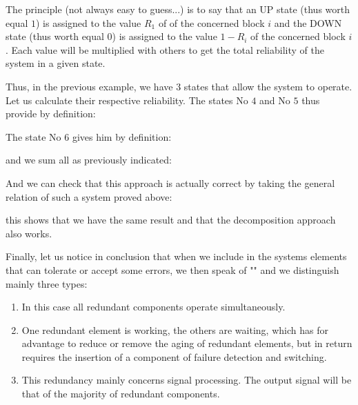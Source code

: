 	The principle (not always easy to guess...) is to say that an UP state (thus worth equal $1$) is assigned to the value $R_1$ of of the concerned block $i$ and the DOWN state (thus worth equal $0$) is assigned to the value $1-R_i$ of the concerned block $i$. Each value will be multiplied with others to get the total reliability of the system in a given state.
	
	Thus, in the previous example, we have $3$ states that allow the system to operate. Let us calculate their respective reliability. The states No $4$ and No $5$ thus provide by definition:
	
	The state No $6$ gives him by definition:
	
	and we sum all as previously indicated:
	
	And we can check that this approach is actually correct by taking the general relation of such a system proved above:
	
	this shows that we have the same result and that the decomposition approach also works.
	
	Finally, let us notice in conclusion that when we include in the systems elements that can tolerate or accept some errors, we then speak of "" and we distinguish mainly three types:
	\begin{enumerate}
		\item {} In this case all redundant components operate simultaneously.
		
		\item {} One redundant element is working, the others are waiting, which has for advantage to reduce or remove the aging of redundant elements, but in return requires the insertion of a component of failure detection and switching.
		
		\item {} This redundancy mainly concerns signal processing. The output signal will be that of the majority of redundant components.
	\end{enumerate}
		
	\pagebreak
